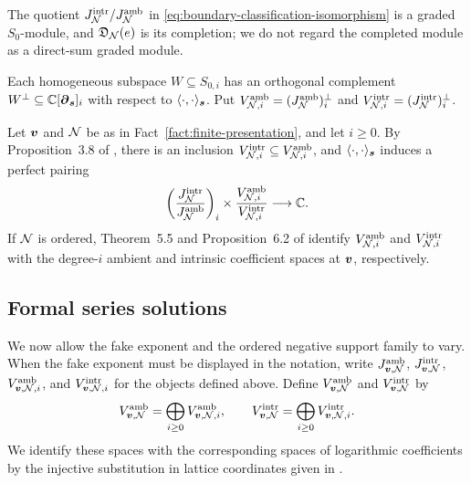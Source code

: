 The quotient \(J_{\mathcal N}^{\mathrm{intr}}/J_{\mathcal N}^{\mathrm{amb}}\) in \eqref{eq:boundary-classification-isomorphism} is a graded \(S_0\)-module, and \(\mathfrak D_{\mathcal N}(e)\) is its completion; we do not regard the completed module as a direct-sum graded module.

Each homogeneous subspace \(W\subseteq S_{0,i}\) has an orthogonal complement \(W^\perp\subseteq\mathbb C[\boldsymbol{\partial}_{\boldsymbol{s}}]_i\) with respect to \(\langle\cdot,\cdot\rangle_{\boldsymbol{s}}\).
Put \(V_{\mathcal N,i}^{\mathrm{amb}} = (J_{\mathcal N}^{\mathrm{amb}})_i^\perp\) and \(V_{\mathcal N,i}^{\mathrm{intr}} = (J_{\mathcal N}^{\mathrm{intr}})_i^\perp\).

\begin{fact}
	\label{fact:defect-coefficient-duality}
	Let \(\boldsymbol{v}\) and \(\mathcal N\) be as in Fact~\ref{fact:finite-presentation}, and let \(i\geq0\).
	By Proposition~3.8 of \cite{Nak26}, there is an inclusion \(V_{\mathcal N,i}^{\mathrm{intr}} \subseteq V_{\mathcal N,i}^{\mathrm{amb}}\), and \(\langle\cdot,\cdot\rangle_{\boldsymbol{s}}\) induces a perfect pairing
	\begin{equation}
		\left(
		\frac{J_{\mathcal N}^{\mathrm{intr}}}
		{J_{\mathcal N}^{\mathrm{amb}}}
		\right)_i
		\times
		\frac{V_{\mathcal N,i}^{\mathrm{amb}}}
		{V_{\mathcal N,i}^{\mathrm{intr}}}
		\longrightarrow\mathbb C.
		\label{eq:defect-coefficient-perfect-pairing}
	\end{equation}
	If \(\mathcal N\) is ordered, Theorem~5.5 and Proposition~6.2 of \cite{OS25} identify \(V_{\mathcal N,i}^{\mathrm{amb}}\) and \(V_{\mathcal N,i}^{\mathrm{intr}}\) with the degree-\(i\) ambient and intrinsic coefficient spaces at \(\boldsymbol{v}\), respectively.
\end{fact}

\subsection{Formal series solutions}

We now allow the fake exponent and the ordered negative support family to vary.
When the fake exponent must be displayed in the notation, write \(J_{\boldsymbol{v},\mathcal N}^{\mathrm{amb}}\), \(J_{\boldsymbol{v},\mathcal N}^{\mathrm{intr}}\), \(V_{\boldsymbol{v},\mathcal N,i}^{\mathrm{amb}}\), and \(V_{\boldsymbol{v},\mathcal N,i}^{\mathrm{intr}}\) for the objects defined above.
Define \(V_{\boldsymbol{v},\mathcal N}^{\mathrm{amb}}\) and \(V_{\boldsymbol{v},\mathcal N}^{\mathrm{intr}}\) by
\[
	V_{\boldsymbol{v},\mathcal N}^{\mathrm{amb}}
	=
	\bigoplus_{i\geq0}V_{\boldsymbol{v},\mathcal N,i}^{\mathrm{amb}},
	\qquad
	V_{\boldsymbol{v},\mathcal N}^{\mathrm{intr}}
	=
	\bigoplus_{i\geq0}V_{\boldsymbol{v},\mathcal N,i}^{\mathrm{intr}}.
\]
We identify these spaces with the corresponding spaces of logarithmic coefficients by the injective substitution in lattice coordinates given in \cite[Sections~5 and~6]{OS25}.

